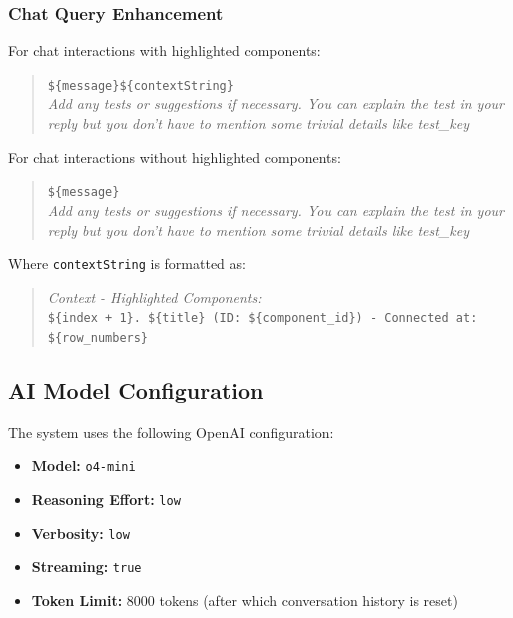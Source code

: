 \subsubsection{Chat Query Enhancement}
For chat interactions with highlighted components:
\begin{quote}
\texttt{\$\{message\}\$\{contextString\}}\\
\textit{Add any tests or suggestions if necessary. You can explain the test in your reply but you don't have to mention some trivial details like test\_key}
\end{quote}

For chat interactions without highlighted components:
\begin{quote}
\texttt{\$\{message\}}\\
\textit{Add any tests or suggestions if necessary. You can explain the test in your reply but you don't have to mention some trivial details like test\_key}
\end{quote}

Where \texttt{contextString} is formatted as:
\begin{quote}
\textit{Context - Highlighted Components:}\\
\texttt{\$\{index + 1\}. \$\{title\} (ID: \$\{component\_id\}) - Connected at: \$\{row\_numbers\}}
\end{quote}

\subsection{AI Model Configuration}

The system uses the following OpenAI configuration:
\begin{itemize}
    \item \textbf{Model:} \texttt{o4-mini}
    \item \textbf{Reasoning Effort:} \texttt{low}
    \item \textbf{Verbosity:} \texttt{low}
    \item \textbf{Streaming:} \texttt{true}
    \item \textbf{Token Limit:} 8000 tokens (after which conversation history is reset)
\end{itemize}
